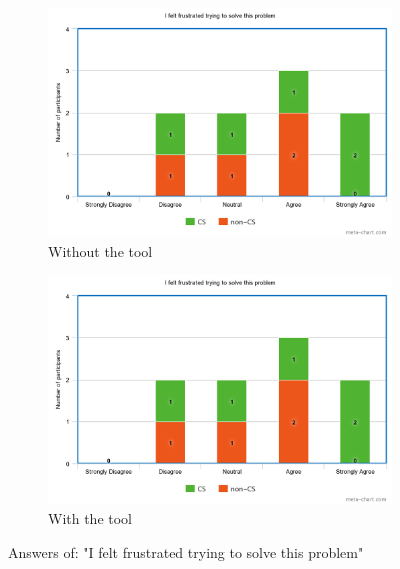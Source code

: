 \documentclass[10pt]{report}
\begin{document}
\begin{figure} [t]
	\centering
	\begin{subfigure}[b]{\textwidth}
		\includegraphics[width=\linewidth]{frust1}
		\caption{Without the tool}
	\end{subfigure} 

	\begin{subfigure}[b]{\textwidth}
		\includegraphics[width=\linewidth]{frust2} 
		\caption{With the tool}
	\end{subfigure}
	\caption{Answers of: "I felt frustrated trying to solve this problem"}
	\label{frustration}%
\end{figure}
\end{document}
